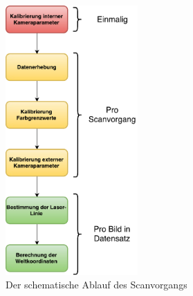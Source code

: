 \begin{figure}
\centering 
\includegraphics[width=0.45\textwidth]{images/ScannerVerfahren.pdf}
\caption{Der schematische Ablauf des Scanvorgangs}\label{fig:scanVorgang}
\end{figure}
\leavevmode

